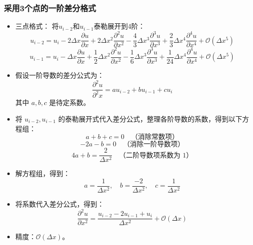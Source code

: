 \documentclass[12pt,a4paper]{article}
\begin{document}
\subsubsection{采用3个点的一阶差分格式}
\begin{itemize}
    \item 三点格式：
    将$u_{i-2}$和$u_{i-1}$泰勒展开到4阶：
    \[u_{i-2} = u_i - 2\Delta x \frac{\partial u}{\partial x} + 2\Delta x^2 \frac{\partial^2 u}{\partial x^2} -\frac{4}{3} \Delta x^3 \frac{\partial^3 u}{\partial x^3} + \frac{2}{3} \Delta x^4 \frac{\partial^4 u}{\partial x^4} + \mathcal{O}(\Delta x^5)\]
    \[u_{i-1} = u_i - \Delta x \frac{\partial u}{\partial x} + \frac{1}{2} \Delta x^2 \frac{\partial^2 u}{\partial x^2} -\frac{1}{6} \Delta x^3 \frac{\partial^3 u}{\partial x^3} + \frac{1}{24} \Delta x^4 \frac{\partial^4 u}{\partial x^4} + \mathcal{O}(\Delta x^5)\]
    \item 假设一阶导数的差分公式为：
    \[
    \frac{\partial^2 u}{\partial^2 x} = a u_{i-2} + b u_{i-1} + c u_i
    \]
    其中 \( a, b, c \) 是待定系数。
    \item 将 \( u_{i-2}, u_{i-1} \) 的泰勒展开式代入差分公式，整理各阶导数的系数，得到以下方程组：
    \[
    a + b + c  = 0 \quad \text{（消除常数项）}
    \]
    \[
    -2a - b  = 0 \quad \text{（消除一阶导数项）}
    \]
    \[
    4a + b  = \frac{2}{\Delta x^2} \quad \text{（二阶导数项系数为 1）}
    \]
    \item 解方程组，得到：
    \[
    a = \frac{1}{\Delta x^2}, \quad b = \frac{-2}{\Delta x^2}, \quad c = \frac{1}{\Delta x^2}
    \]

    \item 将系数代入差分公式，得到：
    \[
    \frac{\partial^2 u}{\partial x^2} = \frac{u_{i-2} -2 u_{i-1} + u_i }{\Delta x^2} + \mathcal{O}(\Delta x)
    \]

    \item 精度：$\mathcal{O}(\Delta x)$。
    
    
\end{itemize}
\end{document}

